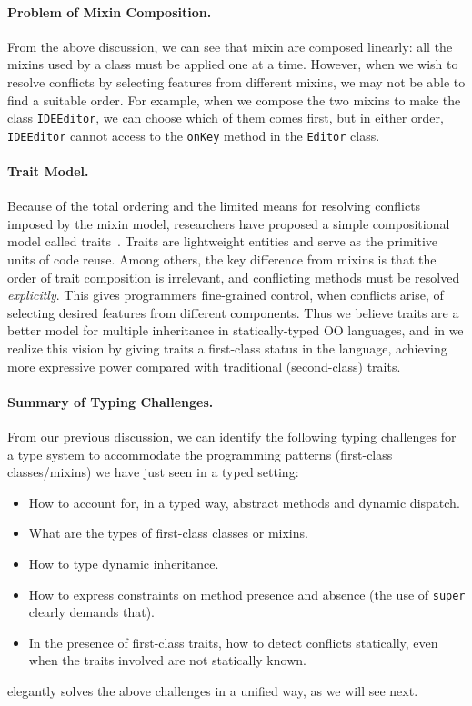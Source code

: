 \paragraph{Problem of Mixin Composition.}
From the above discussion, we can see that mixin are composed linearly: all the
mixins used by a class must be applied one at a time. However, when we wish to
resolve conflicts by selecting features from different mixins, we may not be
able to find a suitable order. For example, when we compose the two mixins to
make the class \lstinline{IDEEditor}, we can choose which of them comes first,
but in either order, \lstinline{IDEEditor} cannot access to the \lstinline{onKey}
method in the \lstinline{Editor} class.

\paragraph{Trait Model.}
Because of the total ordering and the limited means for resolving conflicts imposed by the mixin model,
researchers have proposed a simple compositional model called
traits~\cite{scharli2003traits, Ducasse_2006}. Traits are lightweight entities and serve as
the primitive units of code reuse. Among others, the key difference from
mixins is that the order of trait composition is irrelevant, and conflicting
methods must be resolved \emph{explicitly}. This gives programmers
fine-grained control, when conflicts arise, of selecting desired features from
different components. Thus we believe traits are a better model for multiple
inheritance in statically-typed OO languages, and in \name we realize this
vision by giving traits a first-class status in the language,
achieving more expressive power compared with traditional (second-class) traits.


\paragraph{Summary of Typing Challenges.}
From our previous discussion, we can identify the following typing challenges
for a type system to accommodate the programming patterns (first-class classes/mixins)
we have just seen in a typed setting:
\begin{itemize}
\item How to account for, in a typed way, abstract methods and dynamic dispatch.
\item What are the types of first-class classes or mixins.
\item How to type dynamic inheritance.
\item How to express constraints on method presence and absence (the use of
  \lstinline{super} clearly demands that).
\item In the presence of first-class traits, how to detect conflicts statically,
  even when the traits involved are not statically known.
\end{itemize}
\name elegantly solves the above challenges in a unified way, as
we will see next.


